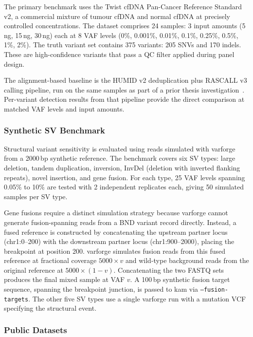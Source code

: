 The primary benchmark uses the Twist cfDNA Pan-Cancer Reference Standard v2, a commercial mixture of tumour cfDNA and normal cfDNA at precisely controlled concentrations.
The dataset comprises 24 samples: 3 input amounts (5\,ng, 15\,ng, 30\,ng) each at 8 VAF levels (0\%, 0.001\%, 0.01\%, 0.1\%, 0.25\%, 0.5\%, 1\%, 2\%).
The truth variant set contains 375 variants: 205 SNVs and 170 indels.
These are high-confidence variants that pass a QC filter applied during panel design.

The alignment-based baseline is the HUMID v2 deduplication plus RASCALL v3 calling pipeline, run on the same samples as part of a prior thesis investigation~\autocite{ZengThesis}.
Per-variant detection results from that pipeline provide the direct comparison at matched VAF levels and input amounts.

\subsubsection{Synthetic SV Benchmark}

Structural variant sensitivity is evaluated using reads simulated with varforge~\autocite{varforge} from a 2000\,bp synthetic reference.
The benchmark covers six SV types: large deletion, tandem duplication, inversion, InvDel (deletion with inverted flanking repeats), novel insertion, and gene fusion.
For each type, 25 VAF levels spanning 0.05\% to 10\% are tested with 2 independent replicates each, giving 50 simulated samples per SV type.

Gene fusions require a distinct simulation strategy because varforge cannot generate fusion-spanning reads from a BND variant record directly.
Instead, a fused reference is constructed by concatenating the upstream partner locus (chr1:0--200) with the downstream partner locus (chr1:900--2000), placing the breakpoint at position 200.
varforge simulates fusion reads from this fused reference at fractional coverage $5000 \times v$ and wild-type background reads from the original reference at $5000 \times (1 - v)$.
Concatenating the two FASTQ sets produces the final mixed sample at VAF $v$.
A 100\,bp synthetic fusion target sequence, spanning the breakpoint junction, is passed to kam via \texttt{--fusion-targets}.
The other five SV types use a single varforge run with a mutation VCF specifying the structural event.

\subsubsection{Public Datasets}

